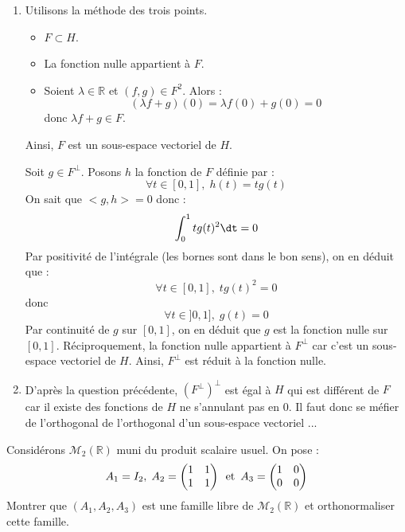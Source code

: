 \documentclass[a4paper,10pt]{report}
\begin{document}
\corr 

\begin{enumerate}
\item Utilisons la méthode des trois points.
\begin{itemize}
\item $F \subset H$.
\item La fonction nulle appartient à $F$.
\item Soient $\lambda \in \mathbb{R}$ et $(f,g) \in F^2$. Alors :
$$ (\lambda f+g)(0) = \lambda f(0)+g(0) = 0$$
donc $\lambda f+g \in F$.
\end{itemize}
Ainsi, $F$ est un sous-espace vectoriel de $H$.

\medskip

\noindent Soit $g \in F^{\perp}$. Posons $h$ la fonction de $F$ définie par :
$$ \forall t \in [0,1], \; h(t)=tg(t)$$
On sait que $<g,h>=0$ donc :
$$ \int_0^1 t g(t)^2 \dt =0$$
Par positivité de l'intégrale (les bornes sont dans le bon sens), on en déduit que :
$$ \forall t \in [0,1], \; t g(t)^2=0$$
donc 
$$ \forall t \in ]0,1], \; g(t)=0$$
Par continuité de $g$ sur $[0,1]$, on en déduit que $g$ est la fonction nulle sur $[0,1]$. Réciproquement, la fonction nulle appartient à $F^{\perp}$ car c'est un sous-espace vectoriel de $H$. Ainsi, $F^{\perp}$ est réduit à la fonction nulle.
\item D'après la question précédente, $(F^{\perp})^{\perp}$ est égal à $H$ qui est différent de $F$ car il existe des fonctions de $H$ ne s'annulant pas en $0$. Il faut donc se méfier de l'orthogonal de l'orthogonal d'un sous-espace vectoriel ...
\end{enumerate}

\begin{Exa} Considérons $\mathcal{M}_2(\mathbb{R})$ muni du produit scalaire usuel. On pose :
$$A_1 = I_2, \; A_2 = \begin{pmatrix}
1 & 1 \\
1 & 1 \\
\end{pmatrix} \, \hbox{ et } \, A_3 = \begin{pmatrix}
1 & 0 \\
0 & 0
\end{pmatrix}$$
Montrer que $(A_1,A_2,A_3)$ est une famille libre de $\mathcal{M}_2(\mathbb{R})$ et orthonormaliser cette famille.
\end{Exa}
\end{document}
